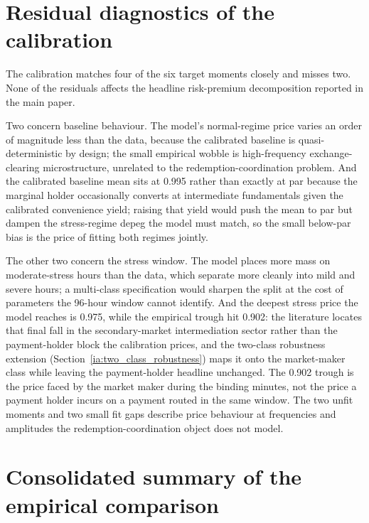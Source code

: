 \section{Residual diagnostics of the calibration}\label{sub:residual_diagnostics}\label{sub:residuals}

The calibration matches four of the six target moments closely and misses two. None of the residuals affects the headline risk-premium decomposition reported in the main paper.

Two concern baseline behaviour. The model's normal-regime price varies an order of magnitude less than the data, because the calibrated baseline is quasi-deterministic by design; the small empirical wobble is high-frequency exchange-clearing microstructure, unrelated to the redemption-coordination problem. And the calibrated baseline mean sits at 0.995 rather than exactly at par because the marginal holder occasionally converts at intermediate fundamentals given the calibrated convenience yield; raising that yield would push the mean to par but dampen the stress-regime depeg the model must match, so the small below-par bias is the price of fitting both regimes jointly.

The other two concern the stress window. The model places more mass on moderate-stress hours than the data, which separate more cleanly into mild and severe hours; a multi-class specification would sharpen the split at the cost of parameters the 96-hour window cannot identify. And the deepest stress price the model reaches is 0.975, while the empirical trough hit 0.902: the literature locates that final fall in the secondary-market intermediation sector \citep{ma_zeng_zhang_2025, gorton_klee_ross_ross_vardoulakis_2026} rather than the payment-holder block the calibration prices, and the two-class robustness extension (Section~\ref{ia:two_class_robustness}) maps it onto the market-maker class while leaving the payment-holder headline unchanged. The 0.902 trough is the price faced by the market maker during the binding minutes, not the price a payment holder incurs on a payment routed in the same window. The two unfit moments and two small fit gaps describe price behaviour at frequencies and amplitudes the redemption-coordination object does not model.

\section{Consolidated summary of the empirical comparison}\label{ia:summary_uc}

